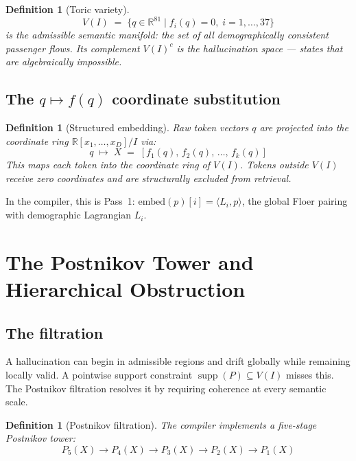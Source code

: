 \documentclass[11pt,a4paper]{article}
\newtheorem{definition}[theorem]{Definition}
\DeclareMathOperator{\supp}{supp}
\begin{document}
\begin{definition}[Toric variety]
\[
  V(I) \;=\; \{ q \in \mathbb{R}^{81} \mid f_i(q) = 0,\;
  i = 1,\ldots,37 \}
\]
is the \emph{admissible semantic manifold}: the set of all
demographically consistent passenger flows.
Its complement $V(I)^c$ is the \emph{hallucination space} ---
states that are algebraically impossible.
\end{definition}

\subsection{The $q \mapsto f(q)$ coordinate substitution}

\begin{definition}[Structured embedding]
Raw token vectors $q$ are projected into the coordinate ring
$\mathbb{R}[x_1,\ldots,x_D]/I$ via:
\[
  q \;\mapsto\; X \;=\; [f_1(q),\, f_2(q),\, \ldots,\, f_k(q)]
\]
This maps each token into the coordinate ring of $V(I)$.
Tokens outside $V(I)$ receive zero coordinates and are
structurally excluded from retrieval.
\end{definition}

In the compiler, this is Pass~1:
$\mathrm{embed}(p)[i] = \langle L_i, p\rangle$, the global
Floer pairing with demographic Lagrangian $L_i$.

\section{The Postnikov Tower and Hierarchical Obstruction}
\label{sec:postnikov}

\subsection{The filtration}

A hallucination can begin in admissible regions and drift globally
while remaining locally valid. A pointwise support constraint
$\supp(P) \subseteq V(I)$ misses this. The Postnikov filtration
resolves it by requiring coherence at every semantic scale.

\begin{definition}[Postnikov filtration]
The compiler implements a five-stage Postnikov tower:
\[
  P_5(X) \to P_4(X) \to P_3(X) \to P_2(X) \to P_1(X)
\]
\end{definition}
\end{document}
